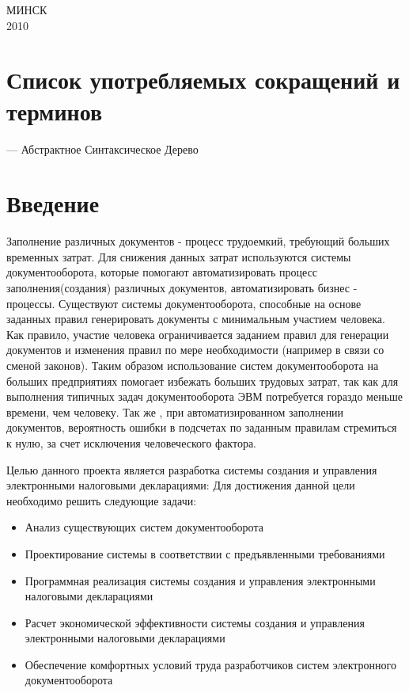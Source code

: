 \documentclass[14pt,a4paper]{reportmod}
\begin{document}
\begin{titlepage}
\vspace{1cm}

\begin{center}
МИНСК\\[10pt]
2010
\end{center}

\end{titlepage}

\linespread{1.05}
\setcounter{page}{4}
\thispagestyle{empty}
\tableofcontents

\chapter*{Список употребляемых сокращений и терминов}
\renewcommand{\labelitemi}{}
\begin{itemize}
   --- Абстрактное Синтаксическое Дерево
\end{itemize}
\renewcommand{\labelitemi}{---}

\chapter*{Введение}
Заполнение различных документов - процесс трудоемкий, требующий больших временных затрат. Для снижения данных затрат используются системы документооборота, которые помогают автоматизировать процесс заполнения(создания) различных документов, автоматизировать бизнес - процессы. Существуют системы документооборота, способные на основе заданных правил генерировать документы с минимальным участием человека. Как правило, участие человека ограничивается заданием правил для генерации документов и изменения правил по мере необходимости (например в связи со сменой законов). Таким образом использование систем документооборота на больших предприятиях помогает избежать больших трудовых затрат, так как для выполнения типичных задач документооборота ЭВМ потребуется гораздо меньше времени, чем человеку. Так же , при автоматизированном заполнении документов, вероятность ошибки в подсчетах по заданным правилам стремиться к нулю, за счет исключения человеческого фактора.


Целью данного проекта является разработка системы создания и управления электронными налоговыми декларациями: Для достижения данной цели необходимо решить следующие задачи:
\begin{itemize}
  \item Анализ существующих систем документооборота
  \item Проектирование системы в соответствии с предъявленными требованиями
  \item Программная реализация системы создания и управления электронными налоговыми декларациями
  \item Расчет экономической эффективности системы создания и управления электронными налоговыми декларациями
  \item Обеспечение комфортных условий труда разработчиков систем электронного документооборота
\end{itemize}
\end{document}
